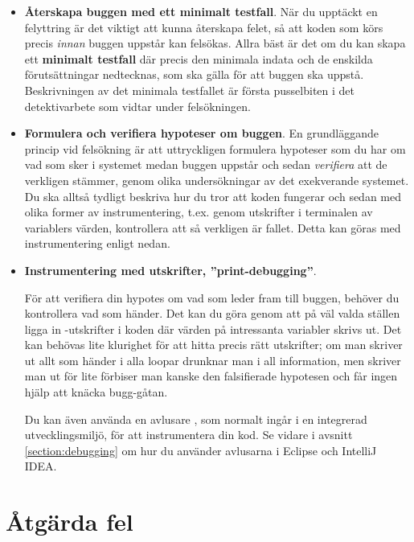 \begin{itemize}

\item \textbf{Återskapa buggen med ett minimalt testfall}. 
När du upptäckt en felyttring är det viktigt att kunna återskapa felet, så att koden som körs precis \emph{innan} buggen uppstår kan felsökas. Allra bäst är det om du kan skapa ett \textbf{minimalt testfall} där precis den minimala indata och de enskilda förutsättningar nedtecknas, som ska gälla för att buggen ska uppstå. Beskrivningen av det minimala testfallet är första pusselbiten i det detektivarbete som vidtar under felsökningen.

\item \textbf{Formulera och verifiera hypoteser om buggen}. En grundläggande princip vid felsökning är att uttryckligen formulera hypoteser som du har om vad som sker i systemet medan buggen uppstår och sedan \emph{verifiera} att de verkligen stämmer, genom olika undersökningar av det exekverande systemet. Du ska alltså tydligt beskriva hur du tror att koden fungerar och sedan med olika former av instrumentering, t.ex. genom utskrifter i terminalen av variablers värden, kontrollera att så verkligen är fallet. Detta kan göras med instrumentering enligt nedan.

\item \textbf{Instrumentering med utskrifter, ''print-debugging''}.

För att verifiera din hypotes om vad som leder fram till buggen, behöver du kontrollera vad som händer. Det kan du göra genom att på väl valda ställen ligga in -utskrifter i koden där värden på intressanta variabler skrivs ut. Det kan behövas lite klurighet för att hitta precis rätt utskrifter; om man skriver ut allt som händer i alla loopar drunknar man i all information, men skriver man ut för lite förbiser man kanske den falsifierade hypotesen och får ingen hjälp att knäcka bugg-gåtan.  

Du kan även använda en avlusare , som normalt ingår i en integrerad utvecklingsmiljö, för att instrumentera din kod. Se vidare i avsnitt \ref{section:debugging} om hur du använder avlusarna i Eclipse och IntelliJ IDEA.

\end{itemize}



\section{Åtgärda fel}

